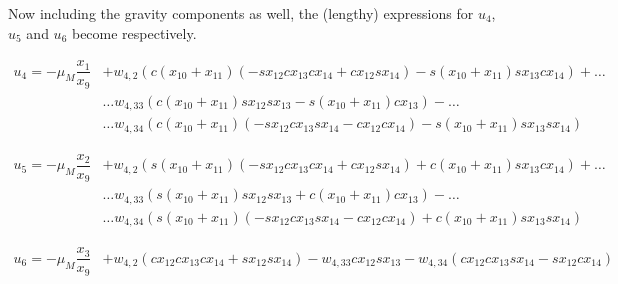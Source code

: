 Now including the gravity components as well, the (lengthy) expressions for $u_{4}$, $u_{5}$ and $u_{6}$ become  respectively.

\begin{equation} \label{eq:u4Com}
\begin{split}
u_{4}= -\mu_{M}\dfrac{x_{1}}{x_{9}}&+w_{4,2} \left( c\left(x_{10}+x_{11}\right)\left(-sx_{12} cx_{13} cx_{14} +cx_{12} sx_{14} \right)-s\left(x_{10}+x_{11}\right) sx_{13} cx_{14} \right)+ \dots \\
& \dotsc  w_{4,33} \left( c\left(x_{10}+x_{11}\right) sx_{12} sx_{13} -s\left(x_{10}+x_{11}\right) cx_{13}\right)-\dots \\
& \dotsc w_{4,34} \left( c\left(x_{10}+x_{11}\right)\left(-sx_{12} cx_{13} sx_{14} -cx_{12} cx_{14} \right)-s\left(x_{10}+x_{11}\right) sx_{13} sx_{14} \right)
\end{split}
\end{equation}

\begin{equation} \label{eq:u5Com}
\begin{split}
u_{5}= -\mu_{M}\dfrac{x_{2}}{x_{9}}&+w_{4,2} \left( s\left(x_{10}+x_{11}\right)\left(-sx_{12} cx_{13} cx_{14} +cx_{12} sx_{14} \right)+c\left(x_{10}+x_{11}\right) sx_{13} cx_{14}  \right)+ \dots \\
& \dotsc w_{4,33} \left( s\left(x_{10}+x_{11}\right) sx_{12} sx_{13} +c\left(x_{10}+x_{11}\right) cx_{13} \right)- \dots \\
& \dotsc w_{4,34} \left(s\left(x_{10}+x_{11}\right)\left(-sx_{12} cx_{13} sx_{14} -cx_{12} cx_{14} \right)+c\left(x_{10}+x_{11}\right) sx_{13} sx_{14} \right)
\end{split}
\end{equation} 

\begin{equation} \label{eq:u6Com}
\begin{split}
u_{6}= -\mu_{M}\dfrac{x_{3}}{x_{9}}&+w_{4,2} \left(cx_{12} cx_{13} cx_{14} +sx_{12} sx_{14}  \right)  - w_{4,33}cx_{12} sx_{13}  -w_{4,34} \left( cx_{12} cx_{13} sx_{14} -sx_{12} cx_{14} \right)
\end{split}
\end{equation}

 
%

